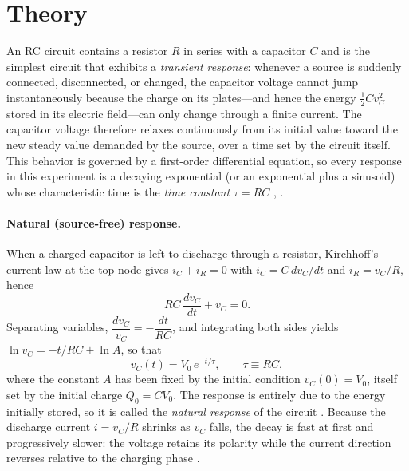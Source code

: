 \documentclass[12pt,a4paper]{article}
\begin{document}
	\section{Theory}
	\label{sec:theory}
	An RC circuit contains a resistor $R$ in series with a capacitor $C$
	and is the simplest circuit that exhibits a \emph{transient response}:
	whenever a source is suddenly connected, disconnected, or changed, the
	capacitor voltage cannot jump instantaneously because the charge on
	its plates---and hence the energy $\tfrac{1}{2}Cv_C^2$ stored in its
	electric field---can only change through a finite current.  The
	capacitor voltage therefore relaxes continuously from its initial
	value toward the new steady value demanded by the source, over a time
	set by the circuit itself.  This behavior is governed by a first-order
	differential equation, so every response in this experiment is a
	decaying exponential (or an exponential plus a sinusoid) whose
	characteristic time is the \emph{time constant} $\tau = RC$
	\cite{sadiku}, \cite{boylestad}.
	
	\paragraph{Natural (source-free) response.}
	When a charged capacitor is left to discharge through a resistor,
	Kirchhoff's current law at the top node gives $i_C + i_R = 0$ with
	$i_C = C\,dv_C/dt$ and $i_R = v_C/R$, hence
	\begin{equation}
		RC\,\frac{dv_C}{dt} + v_C = 0 .
		\label{eq:natural-ode}
	\end{equation}
	Separating variables, $\dfrac{dv_C}{v_C} = -\dfrac{dt}{RC}$, and
	integrating both sides yields
	$\ln v_C = -t/RC + \ln A$, so that
	\begin{equation}
		v_C(t) = V_0\, e^{-t/\tau}, \qquad \tau \equiv RC,
		\label{eq:natural}
	\end{equation}
	where the constant $A$ has been fixed by the initial condition
	$v_C(0) = V_0$, itself set by the initial charge $Q_0 = C V_0$.  The
	response is entirely due to the energy initially stored, so it is
	called the \emph{natural response} of the circuit \cite{sadiku}.
	Because the discharge current $i = v_C/R$ shrinks as $v_C$ falls, the
	decay is fast at first and progressively slower: the voltage retains
	its polarity while the current direction reverses relative to the
	charging phase \cite{boylestad}.
	
\end{document}
